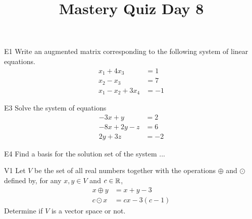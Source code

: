 \documentclass{sbgLAquiz}
\title{Mastery Quiz Day 8 }
\begin{document}
\begin{problem}{E1}
Write an augmented matrix corresponding to the following system of linear equations.
\begin{align*}
x_1+4x_3 &= 1 \\
x_2-x_3 &= 7 \\
x_1-x_2+3x_4 &= -1
\end{align*}
\end{problem}

\begin{problem}{E3}
Solve the system of equations
\begin{align*}
-3x +y &= 2\\
-8x+2y-z &= 6 \\
2y+3z &= -2
\end{align*}


\end{problem}
\newpage

\begin{problem}{E4}
Find a basis for the solution set of the system ...
\end{problem}

\begin{problem}{V1}
Let $V$ be the  set of all real numbers together with the operations $\oplus$ and $\odot$ defined by, for any $x,y \in V$ and $c \in \mathbb{R}$,
\begin{align*}
x\oplus y  &= x+y-3 \\
c \odot x &= cx-3(c-1)
\end{align*}
Determine if $V$ is a vector space or not.
\end{problem}
\end{document}
